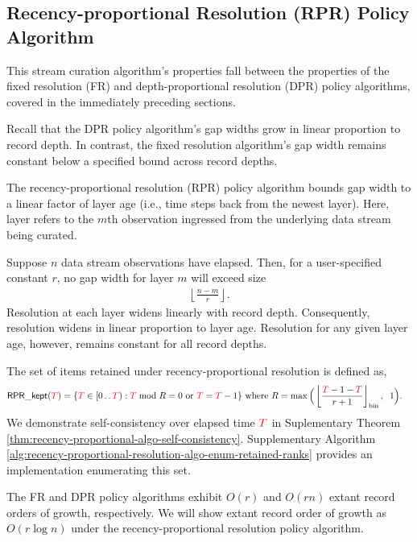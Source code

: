 \subsection{Recency-proportional Resolution (RPR) Policy Algorithm}
\label{sec:recency-proportional-resolution-algo}

This stream curation algorithm's properties fall between the properties of the fixed resolution (FR) and depth-proportional resolution (DPR) policy algorithms, covered in the immediately preceding sections.

Recall that the DPR policy algorithm's gap widths grow in linear proportion to record depth.
In contrast, the fixed resolution algorithm's gap width remains constant below a specified bound across record depths.

The recency-proportional resolution (RPR) policy algorithm bounds gap width to a linear factor of layer age (i.e., time steps back from the newest layer).
Here, layer refers to the $m$th observation ingressed from the underlying data stream being curated.

Suppose $n$ data stream observations have elapsed.
Then, for a user-specified constant $r$, no gap width for layer $m$ will exceed size
\begin{align}
  \left\lfloor \frac{n - m}{r} \right\rfloor.
  \label{eqn:rpr-gap}
\end{align}
Resolution at each layer widens linearly with record depth.
Consequently, resolution widens in linear proportion to layer age.
Resolution for any given layer age, however, remains constant for all record depths.

The set of items retained under recency-proportional resolution is defined as,
\begin{align}
\mathsf{RPR\_kept}(\colorT)
&= \{
\colorTbar \in [0\twodots\colorT)
: \colorTbar \bmod R = 0 \text{ or } \colorTbar = \colorT - 1
\}
\text{ where }
R = \max\Big(\left \lfloor \frac{\colorT  - 1 - \colorTbar}{r + 1} \right \rfloor_{\mathrm{bin}}, \;\; 1\Big).
\label{eqn:rpr_kept}
\end{align}
We demonstrate self-consistency over elapsed time $\colorT$ in Suplementary Theorem \ref{thm:recency-proportional-algo-self-consistency}.
Supplementary Algorithm \ref{alg:recency-proportional-resolution-algo-enum-retained-ranks} provides an implementation enumerating this set.

The FR and DPR policy algorithms exhibit $O(r)$ and $O(rn)$ extant record orders of growth, respectively.
We will show extant record order of growth as $O(r\log{n})$ under the recency-proportional resolution policy algorithm.

